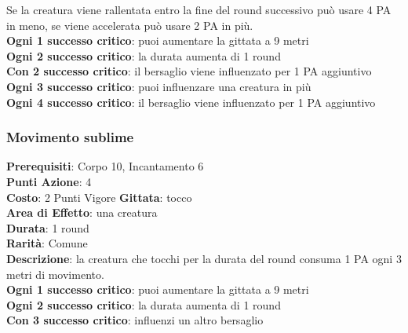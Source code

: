 \documentclass[12pt,a4paper,twoside,openany]{book}
\begin{document}
\begin{multicols}{2}
Se la creatura viene rallentata entro la fine del round successivo può usare 4 PA in meno, se viene accelerata può usare 2 PA in più.\\
\textbf{Ogni 1 successo critico}: puoi aumentare la gittata a 9 metri\\
\textbf{Ogni 2 successo critico}: la durata aumenta di 1 round\\
\textbf{Con 2 successo critico}: il bersaglio viene influenzato per 1 PA aggiuntivo\\
\textbf{Ogni 3 successo critico}: puoi influenzare una creatura in più\\
\textbf{Ogni 4 successo critico}: il bersaglio viene influenzato per 1 PA aggiuntivo

\subsubsection*{Movimento sublime}
\textbf{Prerequisiti}: Corpo 10, Incantamento 6\\
\textbf{Punti Azione}: 4\\
\textbf{Costo}: 2 Punti Vigore
\textbf{Gittata}: tocco \\
\textbf{Area di Effetto}: una creatura\\
\textbf{Durata}: 1 round\\
\textbf{Rarità}: Comune\\
\textbf{Descrizione}: la creatura che tocchi per la durata del round consuma 1 PA ogni 3 metri di movimento.\\
\textbf{Ogni 1 successo critico}: puoi aumentare la gittata a 9 metri\\
\textbf{Ogni 2 successo critico}: la durata aumenta di 1 round\\
\textbf{Con 3 successo critico}: influenzi un altro bersaglio \\


\end{multicols}
\end{document}
